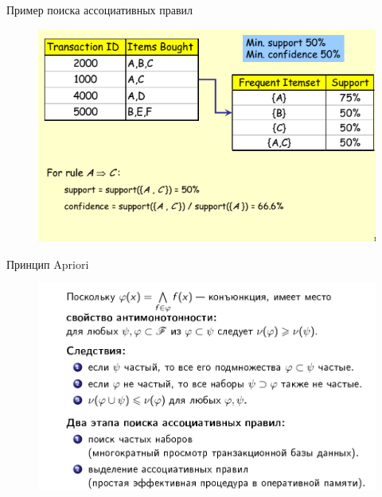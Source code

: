 \documentclass{beamer}
\begin{document}
\begin{frame}{Пример поиска ассоциативных правил}
	\begin{figure}[h]
		\centering
		\includegraphics[scale=0.75]{images/lec08-pic08.png}
	\end{figure}
\end{frame}

\begin{frame}{Принцип Apriori}
	\begin{figure}[h]
		\centering
		\includegraphics[scale=0.45]{images/lec08-pic09.png}
	\end{figure}
\end{frame}
\end{document}
